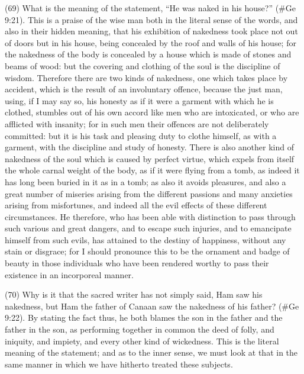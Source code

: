 (69) What is the meaning of the statement, ``He was naked in his house?'' (\#Ge 9:21). This is
a praise of the wise man both in the literal sense of the words, and also in their hidden meaning,
that his exhibition of nakedness took place not out of doors but in his house, being concealed by
the roof and walls of his house; for the nakedness of the body is concealed by a house which is
made of stones and beams of wood: but the covering and clothing of the soul is the discipline of
wisdom. Therefore there are two kinds of nakedness, one which takes place by accident, which is
the result of an involuntary offence, because the just man, using, if I may say so, his honesty as if it
were a garment with which he is clothed, stumbles out of his own accord like men who are
intoxicated, or who are afflicted with insanity; for in such men their offences are not deliberately
committed: but it is his task and pleasing duty to clothe himself, as with a garment, with the
discipline and study of honesty. There is also another kind of nakedness of the soul which is
caused by perfect virtue, which expels from itself the whole carnal weight of the body, as if it were
flying from a tomb, as indeed it has long been buried in it as in a tomb; as also it avoids pleasures,
and also a great number of miseries arising from the different passions and many anxieties arising
from misfortunes, and indeed all the evil effects of these different circumstances. He therefore,
who has been able with distinction to pass through such various and great dangers, and to escape
such injuries, and to emancipate himself from such evils, has attained to the destiny of happiness,
without any stain or disgrace; for I should pronounce this to be the ornament and badge of beauty
in those individuals who have been rendered worthy to pass their existence in an incorporeal
manner.

(70) Why is it that the sacred writer has not simply said, Ham saw his nakedness, but Ham the
father of Canaan saw the nakedness of his father? (\#Ge 9:22). By stating the fact thus, he
both blames the son in the father and the father in the son, as performing together in common the
deed of folly, and iniquity, and impiety, and every other kind of wickedness. This is the literal
meaning of the statement; and as to the inner sense, we must look at that in the same manner in
which we have hitherto treated these subjects.


